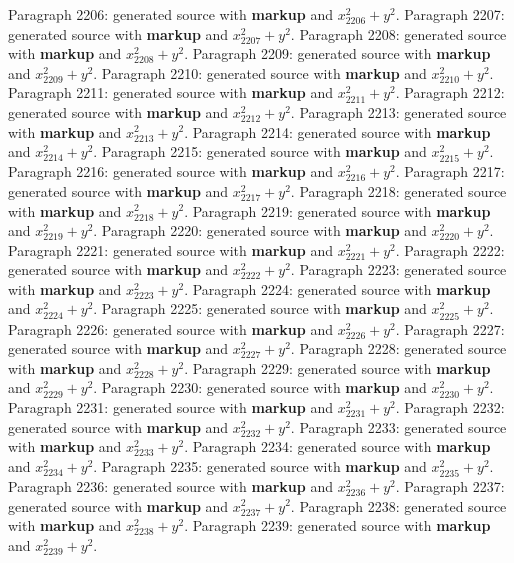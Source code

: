 \documentclass{article}
\begin{document}
Paragraph 2206: generated source with \textbf{markup} and $x_{2206}^2 + y^2$.
Paragraph 2207: generated source with \textbf{markup} and $x_{2207}^2 + y^2$.
Paragraph 2208: generated source with \textbf{markup} and $x_{2208}^2 + y^2$.
Paragraph 2209: generated source with \textbf{markup} and $x_{2209}^2 + y^2$.
Paragraph 2210: generated source with \textbf{markup} and $x_{2210}^2 + y^2$.
Paragraph 2211: generated source with \textbf{markup} and $x_{2211}^2 + y^2$.
Paragraph 2212: generated source with \textbf{markup} and $x_{2212}^2 + y^2$.
Paragraph 2213: generated source with \textbf{markup} and $x_{2213}^2 + y^2$.
Paragraph 2214: generated source with \textbf{markup} and $x_{2214}^2 + y^2$.
Paragraph 2215: generated source with \textbf{markup} and $x_{2215}^2 + y^2$.
Paragraph 2216: generated source with \textbf{markup} and $x_{2216}^2 + y^2$.
Paragraph 2217: generated source with \textbf{markup} and $x_{2217}^2 + y^2$.
Paragraph 2218: generated source with \textbf{markup} and $x_{2218}^2 + y^2$.
Paragraph 2219: generated source with \textbf{markup} and $x_{2219}^2 + y^2$.
Paragraph 2220: generated source with \textbf{markup} and $x_{2220}^2 + y^2$.
Paragraph 2221: generated source with \textbf{markup} and $x_{2221}^2 + y^2$.
Paragraph 2222: generated source with \textbf{markup} and $x_{2222}^2 + y^2$.
Paragraph 2223: generated source with \textbf{markup} and $x_{2223}^2 + y^2$.
Paragraph 2224: generated source with \textbf{markup} and $x_{2224}^2 + y^2$.
Paragraph 2225: generated source with \textbf{markup} and $x_{2225}^2 + y^2$.
Paragraph 2226: generated source with \textbf{markup} and $x_{2226}^2 + y^2$.
Paragraph 2227: generated source with \textbf{markup} and $x_{2227}^2 + y^2$.
Paragraph 2228: generated source with \textbf{markup} and $x_{2228}^2 + y^2$.
Paragraph 2229: generated source with \textbf{markup} and $x_{2229}^2 + y^2$.
Paragraph 2230: generated source with \textbf{markup} and $x_{2230}^2 + y^2$.
Paragraph 2231: generated source with \textbf{markup} and $x_{2231}^2 + y^2$.
Paragraph 2232: generated source with \textbf{markup} and $x_{2232}^2 + y^2$.
Paragraph 2233: generated source with \textbf{markup} and $x_{2233}^2 + y^2$.
Paragraph 2234: generated source with \textbf{markup} and $x_{2234}^2 + y^2$.
Paragraph 2235: generated source with \textbf{markup} and $x_{2235}^2 + y^2$.
Paragraph 2236: generated source with \textbf{markup} and $x_{2236}^2 + y^2$.
Paragraph 2237: generated source with \textbf{markup} and $x_{2237}^2 + y^2$.
Paragraph 2238: generated source with \textbf{markup} and $x_{2238}^2 + y^2$.
Paragraph 2239: generated source with \textbf{markup} and $x_{2239}^2 + y^2$.
\end{document}
